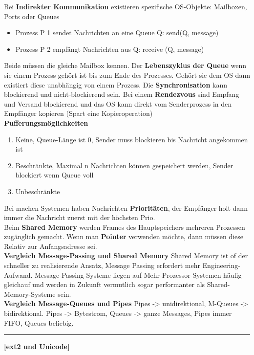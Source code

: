 \documentclass[8pt]{extarticle}
\let\oldtextbf\textbf
\renewcommand{\textbf}{\tiny\oldtextbf}
\begin{document}
\begin{multicols*}{5}
	Bei \textbf{Indirekter Kommunikation} existieren spezifische OS-Objekte: Mailboxen, Ports oder Queues
	\begin{itemize} [noitemsep, topsep=0pt, leftmargin=*]
		\item Prozess P 1 sendet Nachrichten an eine Queue Q: send(Q, message)
		\item Prozess P 2 empfängt Nachrichten aus Q: receive (Q, message)
	\end{itemize} Beide müssen die gleiche Mailbox kennen. Der \textbf{Lebenszyklus der Queue} wenn sie einem Prozess gehört ist bis zum Ende des Prozesses. Gehört sie dem OS dann existiert diese unabhängig von einem Prozess. Die \textbf{Synchronisation} kann blockierend und nicht-blockierend sein. Bei einem \textbf{Rendezvous} sind Empfang und Versand blockierend und das OS kann direkt vom Senderprozess in den Empfänger kopieren (Spart eine Kopieroperation)\\
	\textbf{Pufferungsmöglichkeiten}
	\begin{enumerate} [noitemsep, topsep=0pt, leftmargin=*]
		\item Keine, Queue-Länge ist 0, Sender muss blockieren bis Nachricht angekommen ist
		\item Beschränkte, Maximal n Nachrichten können gespeichert werden, Sender blockiert wenn Queue voll
		\item Unbeschränkte
	\end{enumerate}
	Bei machen Systemen haben Nachrichten \textbf{Prioritäten}, der Empfänger holt dann immer die Nachricht zuerst mit der höchsten Prio.\\
	Beim \textbf{Shared Memory} werden Frames des Hauptspeichers mehreren Prozessen zugänglich gemacht. Wenn man \textbf{Pointer} verwenden möchte, dann müssen diese Relativ zur Anfangsadresse sei.\\
	
	\textbf{Vergleich Message-Passing und Shared Memory} Shared Memory ist of der schneller zu realisierende Ansatz, Message Passing erfordert mehr Engineering-Aufwand. Message-Passing-Systeme liegen auf Mehr-Prozessor-Systemen häufig gleichauf und werden in Zukunft vermutlich sogar performanter als Shared-Memory-Systeme sein.\\
	
	\textbf{Vergleich Message-Queues und Pipes} Pipes -> unidirektional, M-Queues -> bidirektional. Pipes -> Bytestrom, Queues -> ganze Messages, Pipes immer FIFO, Queues beliebig.
	
	
	\vspace{5pt}
	\rule{\linewidth}{0.4pt}
	\textbf{[ext2 und Unicode]}\\
	

\end{multicols*}
\end{document}
